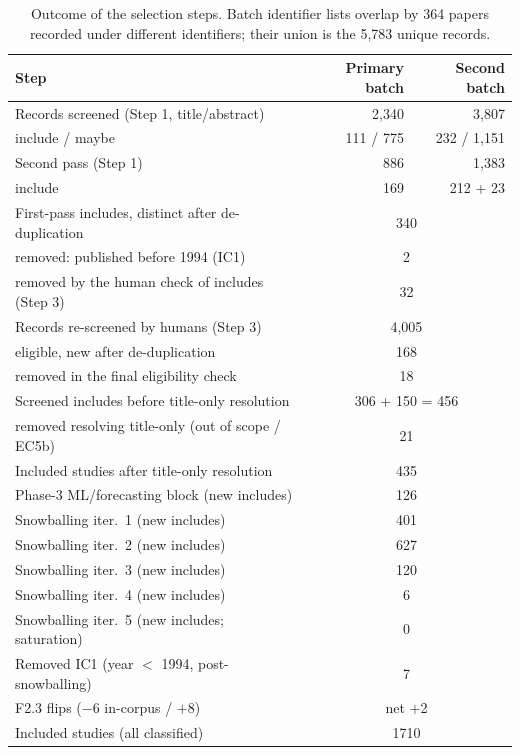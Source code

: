 \documentclass[preprint,12pt,authoryear=false]{elsarticle}
\begin{document}
\begin{table}[t]
\centering\small
\caption{Outcome of the selection steps. Batch identifier lists overlap by 364 papers recorded under different identifiers; their union is the 5,783 unique records.}\label{tab:selection}
\footnotesize
\begin{tabular}{lrr}
\toprule
Step & Primary batch & Second batch \\
\midrule
Records screened (Step 1, title/abstract) & 2,340 & 3,807 \\
\quad include / maybe & 111 / 775 & 232 / 1,151 \\
Second pass (Step 1) & 886 & 1,383 \\
\quad include & 169 & 212 + 23 \\
\midrule
First-pass includes, distinct after de-duplication & \multicolumn{2}{c}{340} \\
\quad removed: published before 1994 (IC1) & \multicolumn{2}{c}{2} \\
\quad removed by the human check of includes (Step 3) & \multicolumn{2}{c}{32} \\
Records re-screened by humans (Step 3) & \multicolumn{2}{c}{4,005} \\
\quad eligible, new after de-duplication & \multicolumn{2}{c}{168} \\
\quad removed in the final eligibility check & \multicolumn{2}{c}{18} \\
\midrule
Screened includes before title-only resolution & \multicolumn{2}{c}{306 + 150 = 456} \\
\quad removed resolving title-only (out of scope / EC5b) & \multicolumn{2}{c}{21} \\
Included studies after title-only resolution & \multicolumn{2}{c}{435} \\
Phase-3 ML/forecasting block (new includes) & \multicolumn{2}{c}{126} \\
Snowballing iter.~1 (new includes) & \multicolumn{2}{c}{401} \\
Snowballing iter.~2 (new includes) & \multicolumn{2}{c}{627} \\
Snowballing iter.~3 (new includes) & \multicolumn{2}{c}{120} \\
Snowballing iter.~4 (new includes) & \multicolumn{2}{c}{6} \\
Snowballing iter.~5 (new includes; saturation) & \multicolumn{2}{c}{0} \\
Removed IC1 (year $<$ 1994, post-snowballing) & \multicolumn{2}{c}{7} \\
F2.3 flips ($-$6 in-corpus / $+$8) & \multicolumn{2}{c}{net $+$2} \\
Included studies (all classified) & \multicolumn{2}{c}{1710} \\
\bottomrule
\end{tabular}
\end{table}
\end{document}
